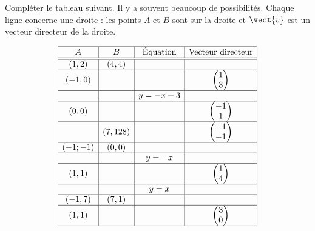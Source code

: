 
\begin{exercice}\label{exosmath-0155}

    Compléter le tableau suivant. Il y a souvent beaucoup de possibilités. Chaque ligne concerne une droite : les points \( A\) et \( B\) sont sur la droite et \( \vect{ v }\) est un vecteur directeur de la droite.

    \begin{equation*}
        \begin{array}[]{|c|c|c|c|}
            \hline
            A&B&\text{Équation}&\text{Vecteur directeur}\\
            \hline\hline
            (1,2)&(4,4)&&\\
            \hline
            (-1,0)&&&\begin{pmatrix}
                1    \\ 
                3    
            \end{pmatrix}\\
            \hline
            &&y=-x+3&\\
            \hline
            (0,0)&&&\begin{pmatrix}
                -1    \\ 
                1    
            \end{pmatrix}\\
            \hline
            &(7,128)&&\begin{pmatrix}
                -1    \\ 
                -1    
            \end{pmatrix}\\
            \hline
            (-1;-1)&(0,0)&&\\
            \hline
            &&y=-x&\\
            \hline
            (1,1)&&&\begin{pmatrix}
                1    \\ 
                4    
            \end{pmatrix}\\
            \hline
            &&y=x&\\
            \hline
            (-1,7)&(7,1)&&\\
            \hline
            (1,1)&&&\begin{pmatrix}
                3    \\ 
                0    
            \end{pmatrix}\\
            \hline
        \end{array}
    \end{equation*}

\end{exercice}

